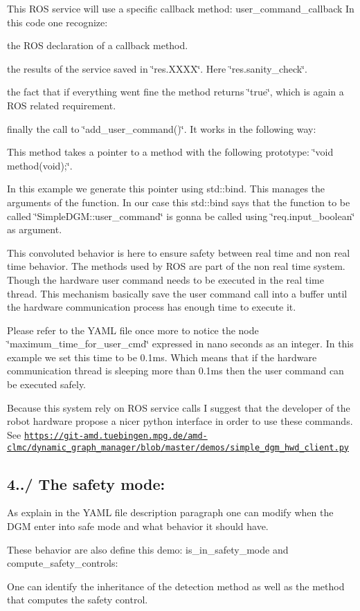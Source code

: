 This R\+OS service will use a specific callback method\+: user\+\_\+command\+\_\+callback  In this code one recognize\+:
\begin{DoxyItemize}
\item the R\+OS declaration of a callback method.
\item the results of the service saved in \char`\"{}res.\+X\+X\+X\+X\char`\"{}. Here \char`\"{}res.\+sanity\+\_\+check\char`\"{}.
\item the fact that if everything went fine the method returns \char`\"{}true\char`\"{}, which is again a R\+OS related requirement.
\item finally the call to \char`\"{}add\+\_\+user\+\_\+command()\char`\"{}. It works in the following way\+:
\begin{DoxyItemize}
\item This method takes a pointer to a method with the following prototype\+: \char`\"{}void method(void);\char`\"{}.
\item In this example we generate this pointer using std\+::bind. This manages the arguments of the function. In our case this std\+::bind says that the function to be called \char`\"{}\+Simple\+D\+G\+M\+::user\+\_\+command\char`\"{} is gonna be called using \char`\"{}req.\+input\+\_\+boolean\char`\"{} as argument.
\end{DoxyItemize}
\end{DoxyItemize}

This convoluted behavior is here to ensure safety between real time and non real time behavior. The methods used by R\+OS are part of the non real time system. Though the hardware user command needs to be executed in the real time thread. This mechanism basically save the user command call into a buffer until the hardware communication process has enough time to execute it.

Please refer to the Y\+A\+ML file once more to notice the node \char`\"{}maximum\+\_\+time\+\_\+for\+\_\+user\+\_\+cmd\char`\"{} expressed in nano seconds as an integer. In this example we set this time to be 0.\+1ms. Which means that if the hardware communication thread is sleeping more than 0.\+1ms then the user command can be executed safely.

Because this system rely on R\+OS service calls I suggest that the developer of the robot hardware propose a nicer python interface in order to use these commands. See \href{https://git-amd.tuebingen.mpg.de/amd-clmc/dynamic_graph_manager/blob/master/demos/simple_dgm_hwd_client.py}{\tt https\+://git-\/amd.\+tuebingen.\+mpg.\+de/amd-\/clmc/dynamic\+\_\+graph\+\_\+manager/blob/master/demos/simple\+\_\+dgm\+\_\+hwd\+\_\+client.\+py}\hypertarget{subsubpage_implement_dgm_dgm_impl_sec_safety_mode}{}\subsection{4../ The safety mode\+:}\label{subsubpage_implement_dgm_dgm_impl_sec_safety_mode}
As explain in the Y\+A\+ML file description paragraph one can modify when the D\+GM enter into safe mode and what behavior it should have.

These behavior are also define this demo\+: is\+\_\+in\+\_\+safety\+\_\+mode and compute\+\_\+safety\+\_\+controls\+: 

One can identify the inheritance of the detection method as well as the method that computes the safety control. 